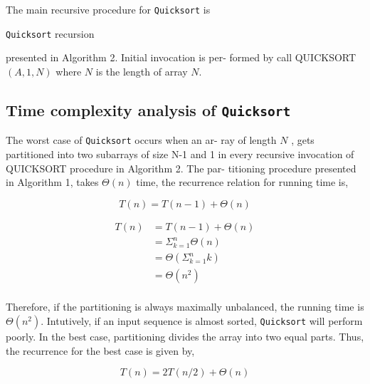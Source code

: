 \documentclass[a4paper, 10pt,twocolumn]{article}
\begin{document}
  The main recursive procedure for \texttt{Quicksort} is


\begin{algorithm}
    \caption{\texttt{Quicksort} recursion}
  \label{algo:qsort2}
\end{algorithm}

presented in Algorithm 2. Initial invocation is per-
formed by call QUICKSORT$(A, 1, N )$ where $N$ is
the length of array $N$.

\subsection{Time complexity analysis of \texttt{Quicksort}}

The worst case of \texttt{Quicksort} occurs when an ar-
ray of length $N$ , gets partitioned into two subarrays
of size N-1 and 1 in every recursive invocation of
QUICKSORT procedure in Algorithm 2. The par-
titioning procedure presented in Algorithm 1, takes
$\Theta(n)$ time, the recurrence relation for running time
is,

\begin{equation*}
    T(n) = T(n-1) + \Theta(n)
\end{equation*}

\indent
\begin{align*}
    T(n) &= T(n-1) + \Theta(n) \\
        &= \Sigma_{k=1}^{n}\Theta(n) \\
        &= \Theta(\Sigma_{k=1}^{n}k) \\
        &= \Theta(n^{2}) \\
\end{align*}

Therefore, if the partitioning is always maximally
unbalanced, the running time is $\Theta(n^{2})$. Intutively,
if an input sequence is almost sorted, \texttt{Quicksort}
will perform poorly. In the best case, partitioning
divides the array into two equal parts. Thus, the
recurrence for the best case is given by,
    
\indent 
\begin{equation*}
    T(n) = 2T(n/2) + \Theta(n)
\end{equation*}
\end{document}

